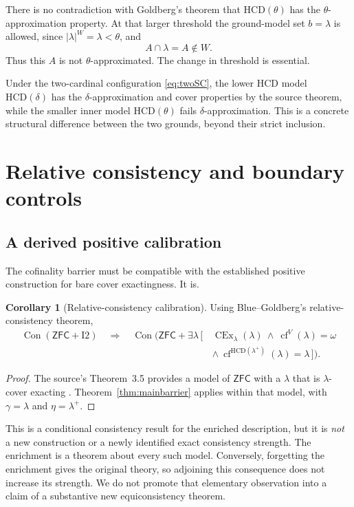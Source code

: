 \documentclass[11pt,letterpaper]{article}
\theoremstyle{definition}
\newtheorem{corollary}[definition]{Corollary}
\newcommand{\ZFC}{\mathsf{ZFC}}
\newcommand{\CEx}{\operatorname{CEx}}
\newcommand{\Con}{\operatorname{Con}}
\newcommand{\cf}{\operatorname{cf}}
\newcommand{\Itwo}{\mathrm{I2}}
\newcommand{\HCD}{\mathrm{HCD}}
\numberwithin{equation}{section}
\begin{document}
There is no contradiction with Goldberg's theorem that $\HCD(\theta)$ has the $\theta$-approximation property. At that larger threshold the ground-model set $b=\lambda$ is allowed, since $|\lambda|^W=\lambda<\theta$, and
\[
 A\cap\lambda=A\notin W.
\]
Thus this $A$ is not $\theta$-approximated. The change in threshold is essential.

Under the two-cardinal configuration \eqref{eq:twoSC}, the lower HCD model $\HCD(\delta)$ has the $\delta$-approximation and cover properties by the source theorem, while the smaller inner model $\HCD(\theta)$ fails $\delta$-approximation. This is a concrete structural difference between the two grounds, beyond their strict inclusion.

\section{Relative consistency and boundary controls}\label{sec:consistency}

\subsection{A derived positive calibration}

The cofinality barrier must be compatible with the established positive construction for bare cover exactingness. It is.

\begin{corollary}[Relative-consistency calibration]\label{cor:consistency}
Using Blue--Goldberg's relative-consistency theorem,
\begin{align*}
 \Con(\ZFC+\Itwo)\quad\Longrightarrow\quad
 \Con\bigl(\ZFC+\exists\lambda\,[\,&\CEx_\lambda(\lambda)\ \wedge\
          \cf^V(\lambda)=\omega\\[-2pt]
          &\wedge\ \cf^{\HCD(\lambda^+)}(\lambda)=\lambda\,]\bigr).
\end{align*}
\end{corollary}

\begin{proof}
The source's Theorem~3.5 provides a model of $\ZFC$ with a $\lambda$ that is $\lambda$-cover exacting \cite{cover}. Theorem~\ref{thm:mainbarrier} applies within that model, with $\gamma=\lambda$ and $\eta=\lambda^+$.
\end{proof}

This is a conditional consistency result for the enriched description, but it is \emph{not} a new construction or a newly identified exact consistency strength. The enrichment is a theorem about every such model. Conversely, forgetting the enrichment gives the original theory, so adjoining this consequence does not increase its strength. We do not promote that elementary observation into a claim of a substantive new equiconsistency theorem.
\end{document}
